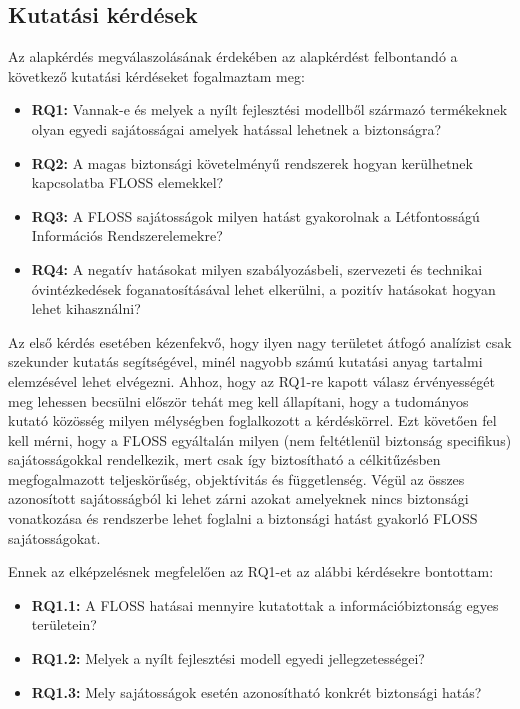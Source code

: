 \documentclass[12pt,magyar,a4paper,oneside]{scrreprt}
\providecommand{\tightlist}{%
  \setlength{\itemsep}{0pt}\setlength{\parskip}{0pt}}
\begin{document}
\hypertarget{kutatuxe1si-kuxe9rduxe9sek}{%
\subsection{Kutatási kérdések}\label{kutatuxe1si-kuxe9rduxe9sek}}

Az alapkérdés megválaszolásának érdekében az alapkérdést felbontandó a
következő kutatási kérdéseket fogalmaztam meg:

\begin{itemize}
\tightlist
\item
  \textbf{RQ1:} Vannak-e és melyek a nyílt fejlesztési modellből
  származó termékeknek olyan egyedi sajátosságai amelyek hatással
  lehetnek a biztonságra?
\item
  \textbf{RQ2:} A magas biztonsági követelményű rendszerek hogyan
  kerülhetnek kapcsolatba FLOSS elemekkel?
\item
  \textbf{RQ3:} A FLOSS sajátosságok milyen hatást gyakorolnak a
  Létfontosságú Információs Rendszerelemekre?
\item
  \textbf{RQ4:} A negatív hatásokat milyen szabályozásbeli, szervezeti
  és technikai óvintézkedések foganatosításával lehet elkerülni, a
  pozitív hatásokat hogyan lehet kihasználni?
\end{itemize}

Az első kérdés esetében kézenfekvő, hogy ilyen nagy területet átfogó
analízist csak szekunder kutatás segítségével, minél nagyobb számú
kutatási anyag tartalmi elemzésével lehet elvégezni. Ahhoz, hogy az
RQ1-re kapott válasz érvényességét meg lehessen becsülni először tehát
meg kell állapítani, hogy a tudományos kutató közösség milyen mélységben
foglalkozott a kérdéskörrel. Ezt követően fel kell mérni, hogy a FLOSS
egyáltalán milyen (nem feltétlenül biztonság specifikus) sajátosságokkal
rendelkezik, mert csak így biztosítható a célkitűzésben megfogalmazott
teljeskörűség, objektívitás és függetlenség. Végül az összes azonosított
sajátosságból ki lehet zárni azokat amelyeknek nincs biztonsági
vonatkozása és rendszerbe lehet foglalni a biztonsági hatást gyakorló
FLOSS sajátosságokat.

Ennek az elképzelésnek megfelelően az RQ1-et az alábbi kérdésekre
bontottam:

\begin{itemize}
\tightlist
\item
  \textbf{RQ1.1:} A FLOSS hatásai mennyire kutatottak a
  információbiztonság egyes területein?
\item
  \textbf{RQ1.2:} Melyek a nyílt fejlesztési modell egyedi
  jellegzetességei?
\item
  \textbf{RQ1.3:} Mely sajátosságok esetén azonosítható konkrét
  biztonsági hatás?
\end{itemize}
\end{document}
